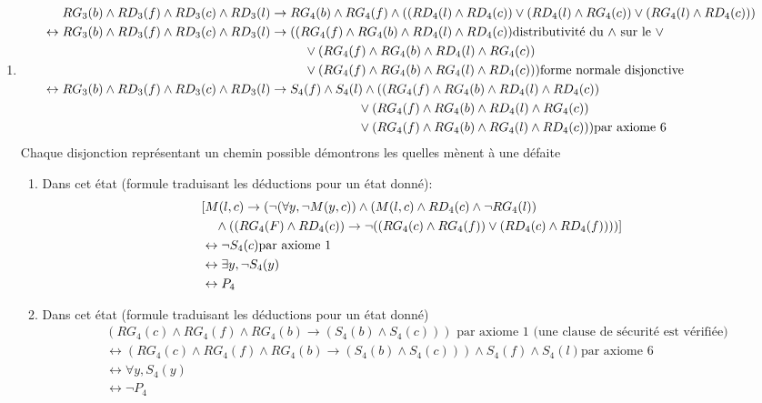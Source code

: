 \documentclass{article}
\begin{document}
\begin{enumerate}
  \item
\begin{align*}
      RG_3(b) \wedge RD_3(f) \wedge RD_3(c) \wedge RD_3(l)&\to RG_4(b) \wedge RG_4(f) \wedge ((RD_4(l)\wedge RD_4(c))\vee (RD_4(l)\wedge RG_4(c))\vee(RG_4(l)\wedge RD_4(c)))\\
      \leftrightarrow RG_3(b) \wedge RD_3(f) \wedge RD_3(c) \wedge RD_3(l) &\to (( RG_4(f) \wedge RG_4(b) \wedge RD_4(l) \wedge RD_4(c))\text{distributivité du $\wedge$ sur le $\vee$}\\
      & \hphantom{aaaaa} \vee (RG_4(f) \wedge RG_4(b) \wedge RD_4(l) \wedge RG_4(c))\\
      & \hphantom{aaaaa} \vee (RG_4(f) \wedge RG_4(b) \wedge RG_4(l) \wedge RD_4(c)))\text{forme normale disjonctive}\\
      \leftrightarrow RG_3(b) \wedge RD_3(f) \wedge RD_3(c) \wedge RD_3(l) &\to S_4(f) \wedge S_4(l) \wedge (( RG_4(f) \wedge RG_4(b) \wedge RD_4(l) \wedge RD_4(c))\\
      & \hphantom{aaaaaaaaaaaaa} \vee (RG_4(f) \wedge RG_4(b) \wedge RD_4(l) \wedge RG_4(c))\\
      & \hphantom{aaaaaaaaaaaaa} \vee (RG_4(f) \wedge RG_4(b) \wedge RG_4(l) \wedge RD_4(c)))\text{par axiome 6}\\
\end{align*}
Chaque disjonction représentant un chemin possible démontrons les quelles mènent à une défaite
  \begin{enumerate}
    \item Dans cet état (formule traduisant les déductions pour un état donné):
    \begin{align*}
      &[M(l,c) \to (\neg(\forall y, \neg M(y,c))\wedge (M(l,c)\wedge RD_4(c)\wedge \neg RG_4(l)) \\
      &\hphantom{aa}  \wedge ((RG_4(F) \wedge RD_4(c))\to \neg ((RG_4(c) \wedge RG_4(f))\vee (RD_4(c)\wedge RD_4(f))))]\\
      &\leftrightarrow \neg S_4(c) \text{par axiome 1}\\
      &\leftrightarrow \exists y,\neg S_4(y)\\
      &\leftrightarrow P_4
    \end{align*}
    \item Dans cet état (formule traduisant les déductions pour un état donné)
    \begin{align*}
      &(RG_4(c)\wedge RG_4(f)\wedge RG_4(b) \to (S_4(b) \wedge S_4(c))) \text{ par axiome 1 (une clause de sécurité est vérifiée)}\\
      &\leftrightarrow (RG_4(c)\wedge RG_4(f)\wedge RG_4(b) \to (S_4(b) \wedge S_4(c))) \wedge S_4(f) \wedge S_4(l)\text{par axiome 6}\\
      &\leftrightarrow \forall y,S_4(y)\\
      &\leftrightarrow \neg P_4
    \end{align*}
  \end{enumerate}
\end{enumerate}
\end{document}
